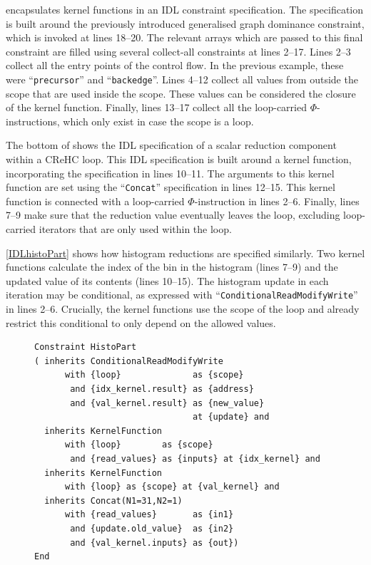      encapsulates kernel functions in an IDL constraint
    specification.
    The specification is built around the previously introduced generalised
    graph dominance constraint, which is invoked at lines 18--20.
    The relevant arrays which are passed to this final constraint are filled
    using several collect-all constraints at lines 2--17.
    Lines 2--3 collect all the entry points of the control flow.
    In the previous example, these were ``{\tt precursor}'' and
    ``{\tt backedge}''.
    Lines 4--12 collect all values from outside the scope that are used inside
    the scope.
    These values can be considered the closure of the kernel function.
    Finally, lines 13--17 collect all the loop-carried $\Phi$-instructions,
    which only exist in case the scope is a loop.

    The bottom of  shows the IDL specification of a
    scalar reduction component within a CReHC loop.
    This IDL specification is built around a kernel function, incorporating the
    specification in lines 10--11.
    The arguments to this kernel function are set using the ``{\tt Concat}''
    specification in lines 12--15.
    This kernel function is connected with a loop-carried $\Phi$-instruction in
    lines 2--6.
    Finally, lines 7--9 make sure that the reduction value eventually leaves the
    loop, excluding loop-carried iterators that are only used within the loop.

    \autoref{IDLhistoPart} shows how histogram reductions are specified
    similarly.
    Two kernel functions calculate the index of the bin in the histogram
    (lines 7--9) and the updated value of its contents (lines 10--15).
    The histogram update in each iteration may be conditional, as expressed with
    ``{\tt ConditionalReadModifyWrite}'' in lines 2--6.
    Crucially, the kernel functions use the scope of the loop and already
    restrict this conditional to only depend on the allowed values.

\begin{figure}[H]
\begin{lstlisting}[language=IDL,label={IDLhistoPart},caption=
   {IDL specification of a histogram reduction within a complex reduction and
    histogram computation:
    Two kernel functions are present: lines 7--9 calculate the index into the
    histogram array, lines 10--11 generate the updated value.
    The read-modify-write step may be conditional.}]
Constraint HistoPart
( inherits ConditionalReadModifyWrite
      with {loop}              as {scope}
       and {idx_kernel.result} as {address}
       and {val_kernel.result} as {new_value}
                               at {update} and
  inherits KernelFunction
      with {loop}        as {scope}
       and {read_values} as {inputs} at {idx_kernel} and
  inherits KernelFunction
      with {loop} as {scope} at {val_kernel} and
  inherits Concat(N1=31,N2=1)
      with {read_values}       as {in1}
       and {update.old_value}  as {in2}
       and {val_kernel.inputs} as {out})
End
\end{lstlisting}
\end{figure}

